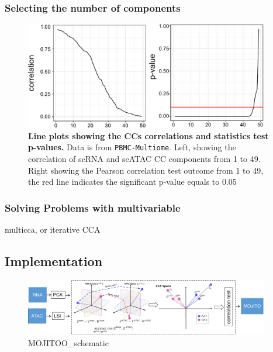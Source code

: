 \subsubsection{Selecting the number of components}

\begin{figure}[!ht]
	\centering
	\includegraphics[width=0.95\textwidth]{CC_pval_select/fig}
	\vspace{0.1cm}
	\caption[Line plots showing the CCs correlations and statistics test p-values.]{\textbf{Line plots showing the CCs correlations and statistics test p-values.} Data is from \texttt{PBMC-Multiome}. Left, showing the correlation of scRNA and scATAC CC components from 1 to 49. Right showing the Pearson correlation test outcome from 1 to 49, the red line indicates the significant p-value equals to 0.05}
	\label{fig:CC_pval_select}
\end{figure}


\subsubsection{Solving Problems with multivariable}

multicca, or iterative CCA

\subsection{Implementation}

\begin{figure}[!ht]
	\centering
	\includegraphics[width=0.95\textwidth]{MOJITOO_schematic/fig}
	\vspace{0.1cm}
	\caption[MOJITOO\_schematic.]{MOJITOO\_schematic}
	\label{fig:MOJITOO_schematic}
\end{figure}

